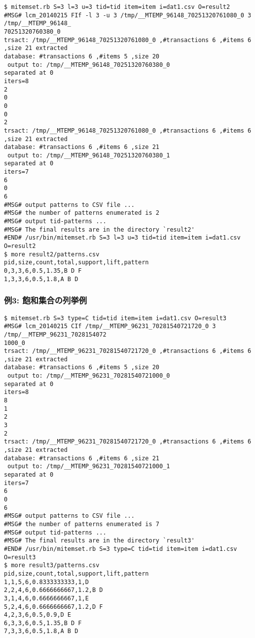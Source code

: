 \begin{Verbatim}[baselinestretch=0.7,frame=single]
$ mitemset.rb S=3 l=3 u=3 tid=tid item=item i=dat1.csv O=result2
#MSG# lcm_20140215 FIf -l 3 -u 3 /tmp/__MTEMP_96148_70251320761080_0 3 /tmp/__MTEMP_96148_
70251320760380_0
trsact: /tmp/__MTEMP_96148_70251320761080_0 ,#transactions 6 ,#items 6 ,size 21 extracted 
database: #transactions 6 ,#items 5 ,size 20
 output to: /tmp/__MTEMP_96148_70251320760380_0
separated at 0
iters=8
2
0
0
0
2
trsact: /tmp/__MTEMP_96148_70251320761080_0 ,#transactions 6 ,#items 6 ,size 21 extracted 
database: #transactions 6 ,#items 6 ,size 21
 output to: /tmp/__MTEMP_96148_70251320760380_1
separated at 0
iters=7
6
0
6
#MSG# output patterns to CSV file ...
#MSG# the number of patterns enumerated is 2
#MSG# output tid-patterns ...
#MSG# The final results are in the directory `result2'
#END# /usr/bin/mitemset.rb S=3 l=3 u=3 tid=tid item=item i=dat1.csv O=result2
$ more result2/patterns.csv
pid,size,count,total,support,lift,pattern
0,3,3,6,0.5,1.35,B D F
1,3,3,6,0.5,1.8,A B D
\end{Verbatim}
\subsubsection*{例3: 飽和集合の列挙例}



\begin{Verbatim}[baselinestretch=0.7,frame=single]
$ mitemset.rb S=3 type=C tid=tid item=item i=dat1.csv O=result3
#MSG# lcm_20140215 CIf /tmp/__MTEMP_96231_70281540721720_0 3 /tmp/__MTEMP_96231_7028154072
1000_0
trsact: /tmp/__MTEMP_96231_70281540721720_0 ,#transactions 6 ,#items 6 ,size 21 extracted 
database: #transactions 6 ,#items 5 ,size 20
 output to: /tmp/__MTEMP_96231_70281540721000_0
separated at 0
iters=8
8
1
2
3
2
trsact: /tmp/__MTEMP_96231_70281540721720_0 ,#transactions 6 ,#items 6 ,size 21 extracted 
database: #transactions 6 ,#items 6 ,size 21
 output to: /tmp/__MTEMP_96231_70281540721000_1
separated at 0
iters=7
6
0
6
#MSG# output patterns to CSV file ...
#MSG# the number of patterns enumerated is 7
#MSG# output tid-patterns ...
#MSG# The final results are in the directory `result3'
#END# /usr/bin/mitemset.rb S=3 type=C tid=tid item=item i=dat1.csv O=result3
$ more result3/patterns.csv
pid,size,count,total,support,lift,pattern
1,1,5,6,0.8333333333,1,D
2,2,4,6,0.6666666667,1.2,B D
3,1,4,6,0.6666666667,1,E
5,2,4,6,0.6666666667,1.2,D F
4,2,3,6,0.5,0.9,D E
6,3,3,6,0.5,1.35,B D F
7,3,3,6,0.5,1.8,A B D
\end{Verbatim}
